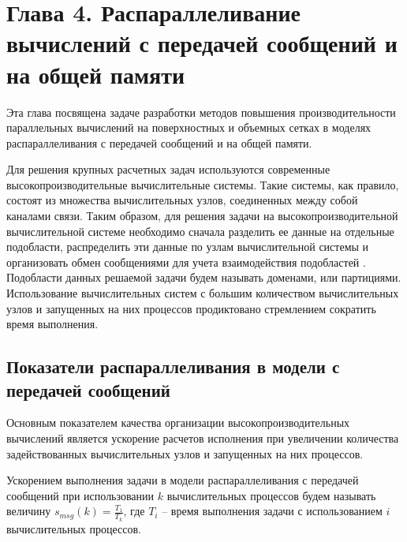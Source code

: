 \newpage
\section*{Глава 4. Распараллеливание вычислений с \mbox{передачей} сообщений и на общей памяти} %
\addtocounter{section}{1}                                                    %
\setcounter{subsection}{0}
\setcounter{figure}{0}
\setcounter{equation}{0}
\setcounter{table}{0}
\setcounter{theorem}{0}
\setcounter{lemma}{0}
\setcounter{definition}{0}

Эта глава посвящена задаче разработки методов повышения производительности параллельных вычислений на поверхностных и объемных сетках в моделях распараллеливания с передачей сообщений и на общей памяти.

Для решения крупных расчетных задач используются современные высокопроизводительные вычислительные системы.
Такие системы, как правило, состоят из множества вычислительных узлов, соединенных между собой каналами связи.
Таким образом, для решения задачи на высокопроизводительной вычислительной системе необходимо сначала разделить ее данные на отдельные подобласти, распределить эти данные по узлам вычислительной системы и организовать обмен сообщениями для учета взаимодействия подобластей \cite{GOST57700HPC}.
Подобласти данных решаемой задачи будем называть доменами, или партициями.
Использование вычислительных систем с большим количеством вычислительных узлов и запущенных на них процессов продиктовано стремлением сократить время выполнения.


\subsection{Показатели распараллеливания в модели с \mbox{передачей} сообщений}

Основным показателем качества организации высокопроизводительных вычислений является ускорение расчетов исполнения при увеличении количества задействованных вычислительных узлов и запущенных на них процессов.

\begin{definition}
Ускорением выполнения задачи в модели распараллеливания с передачей сообщений при использовании $k$ вычислительных процессов будем называть величину $s_{msg}(k) = \frac{T_1}{T_k}$, где $T_i$ -- время выполнения задачи с использованием $i$ вычислительных процессов. 
\end{definition}


